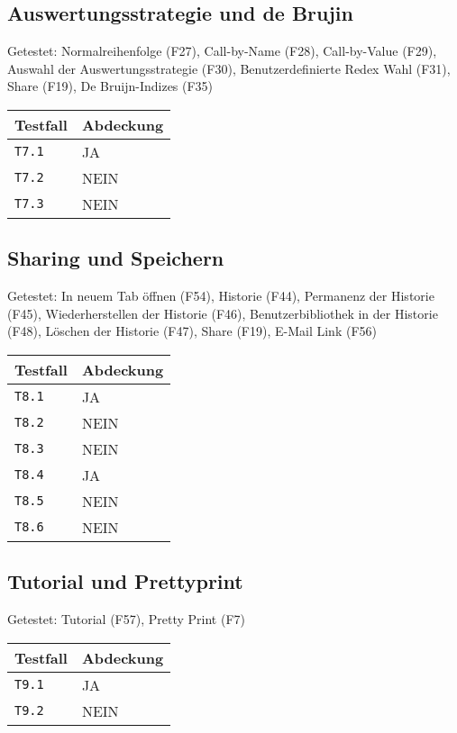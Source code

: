 \documentclass[parskip=full,11pt,twoside]{scrartcl}
\begin{document}
\subsection{Auswertungsstrategie und de Brujin}
    Getestet:  Normalreihenfolge (F27), Call-by-Name (F28), Call-by-Value (F29), Auswahl der Auswertungsstrategie (F30), Benutzerdefinierte Redex Wahl (F31), Share (F19), De Bruijn-Indizes (F35)
	\label{shortcuts}
	\begin{center}
		\begin{tabular}{ p{9cm} p{4cm}}
    			Testfall & Abdeckung \\ \hline
    			\texttt{T7.1} & \cellcolor{green!20}JA \\ \hline
    			\texttt{T7.2} & \cellcolor{red!20}NEIN \\ \hline
			\texttt{T7.3} & \cellcolor{red!20}NEIN \\ \hline
		\end{tabular}
	\end{center}

\subsection{Sharing und Speichern}
    Getestet: In neuem Tab öffnen (F54), Historie (F44), Permanenz der Historie (F45), Wiederherstellen der Historie (F46), Benutzerbibliothek in der Historie (F48), Löschen der Historie (F47), Share (F19), E-Mail Link (F56)
	\label{shortcuts}
	\begin{center}
		\begin{tabular}{ p{9cm} p{4cm}}
    			Testfall & Abdeckung \\ \hline
    			\texttt{T8.1} & \cellcolor{green!20}JA \\ \hline
    			\texttt{T8.2} & \cellcolor{red!20}NEIN \\ \hline
			\texttt{T8.3} & \cellcolor{red!20}NEIN \\ \hline
			\texttt{T8.4} & \cellcolor{green!20}JA \\ \hline
    			\texttt{T8.5} & \cellcolor{red!20}NEIN \\ \hline
			\texttt{T8.6} & \cellcolor{red!20}NEIN \\ \hline
		\end{tabular}
	\end{center}

\subsection{Tutorial und Prettyprint}
    Getestet: Tutorial (F57), Pretty Print (F7)
	\label{shortcuts}
	\begin{center}
		\begin{tabular}{ p{9cm} p{4cm}}
    			Testfall & Abdeckung \\ \hline
    			\texttt{T9.1} & \cellcolor{green!20}JA \\ \hline
    			\texttt{T9.2} & \cellcolor{red!20}NEIN \\ \hline
		\end{tabular}
	\end{center}
\end{document}
